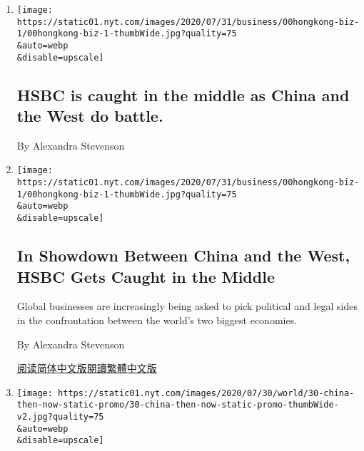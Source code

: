\begin{enumerate}
\def\labelenumi{\arabic{enumi}.}
\item
  \href{/live/2020/08/03/business/stock-market-today-coronavirus/hsbc-is-caught-in-the-middle-as-china-and-the-west-do-battle}{}

  \texttt{[image: https://static01.nyt.com/images/2020/07/31/business/00hongkong-biz-1/00hongkong-biz-1-thumbWide.jpg?quality=75\\\&auto=webp\\\&disable=upscale]}

  \hypertarget{hsbc-is-caught-in-the-middle-as-china-and-the-west-do-battle}{%
  \subsection{HSBC is caught in the middle as China and the West do
  battle.}\label{hsbc-is-caught-in-the-middle-as-china-and-the-west-do-battle}}

  By Alexandra Stevenson
\item
  \href{/2020/08/03/business/hsbc-china-hong-kong-united-states.html}{}

  \texttt{[image: https://static01.nyt.com/images/2020/07/31/business/00hongkong-biz-1/00hongkong-biz-1-thumbWide.jpg?quality=75\\\&auto=webp\\\&disable=upscale]}

  \hypertarget{in-showdown-between-china-and-the-west-hsbc-gets-caught-in-the-middle}{%
  \subsection{In Showdown Between China and the West, HSBC Gets Caught
  in the
  Middle}\label{in-showdown-between-china-and-the-west-hsbc-gets-caught-in-the-middle}}

  Global businesses are increasingly being asked to pick political and
  legal sides in the confrontation between the world's two biggest
  economies.

  By Alexandra Stevenson

  \href{https://cn.nytimes.com/business/20200804/hsbc-china-hong-kong-united-states/}{阅读简体中文版}\href{https://cn.nytimes.com/business/20200804/hsbc-china-hong-kong-united-states/zh-hant/}{閱讀繁體中文版}
\item
  \href{/interactive/2020/07/30/world/asia/china-1950s-echoed-today.html}{}

  \texttt{[image: https://static01.nyt.com/images/2020/07/30/world/30-china-then-now-static-promo/30-china-then-now-static-promo-thumbWide-v2.jpg?quality=75\\\&auto=webp\\\&disable=upscale]}


\end{enumerate}
